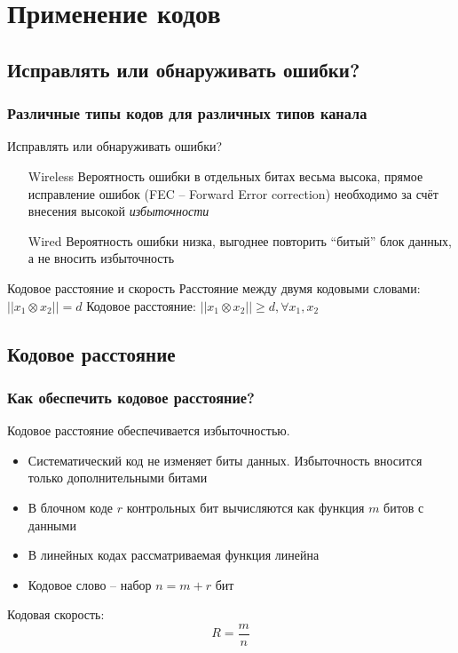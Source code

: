 \documentclass[utf8]{beamer}
\begin{document}
\section{Применение кодов}
\subsection{Исправлять или обнаруживать ошибки?}
\begin{frame}
\frametitle{Различные типы кодов для различных типов канала}
\begin{block}{Исправлять или обнаруживать ошибки?}
\begin{itemize}
 \item [Wireless] Вероятность ошибки в отдельных битах весьма высока, прямое исправление ошибок (FEC -- Forward Error correction) необходимо за счёт внесения высокой \emph{избыточности}
 \item [Wired] Вероятность ошибки низка, выгоднее повторить ``битый'' блок данных, а не вносить избыточность
\end{itemize}
\end{block}
\begin{block}{Кодовое расстояние и скорость}
Расстояние между двумя кодовыми словами:
$
|| x_1 \otimes x_2 || = d
$
Кодовое расстояние:
$
|| x_1 \otimes x_2 || \geq d, \forall x_1, x_2
$
\end{block}
\end{frame}
\subsection{Кодовое расстояние}
\begin{frame}
\frametitle{Как обеспечить кодовое расстояние?}
Кодовое расстояние обеспечивается избыточностью.
\begin{itemize}
 \item Систематический код не изменяет биты данных. Избыточность вносится только дополнительными битами
 \item В блочном коде $r$ контрольных бит вычисляются как функция $m$ битов с данными
 \item В линейных кодах рассматриваемая функция линейна
 \item Кодовое слово -- набор $n=m+r$ бит
\end{itemize}
Кодовая скорость:
$$
R=\frac{m}{n}
$$
\end{frame}
\end{document}
